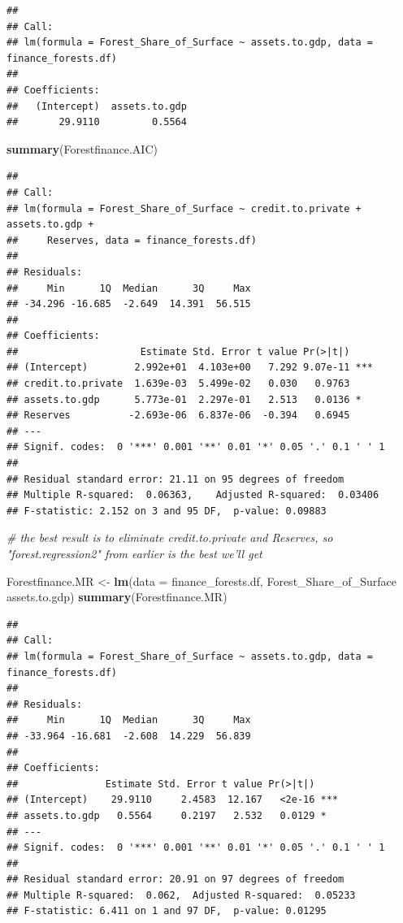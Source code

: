 \documentclass[
  12pt,
]{article}
\newenvironment{Shaded}{\begin{snugshade}}{\end{snugshade}}
\newcommand{\CommentTok}[1]{\textcolor[rgb]{0.56,0.35,0.01}{\textit{#1}}}
\newcommand{\DataTypeTok}[1]{\textcolor[rgb]{0.13,0.29,0.53}{#1}}
\newcommand{\KeywordTok}[1]{\textcolor[rgb]{0.13,0.29,0.53}{\textbf{#1}}}
\newcommand{\NormalTok}[1]{#1}
\newcommand{\OperatorTok}[1]{\textcolor[rgb]{0.81,0.36,0.00}{\textbf{#1}}}
\newcommand{\StringTok}[1]{\textcolor[rgb]{0.31,0.60,0.02}{#1}}
\begin{document}
\begin{verbatim}
## 
## Call:
## lm(formula = Forest_Share_of_Surface ~ assets.to.gdp, data = finance_forests.df)
## 
## Coefficients:
##   (Intercept)  assets.to.gdp  
##       29.9110         0.5564
\end{verbatim}

\begin{Shaded}
\begin{Highlighting}[]
 \KeywordTok{summary}\NormalTok{(Forestfinance.AIC)}
\end{Highlighting}
\end{Shaded}

\begin{verbatim}
## 
## Call:
## lm(formula = Forest_Share_of_Surface ~ credit.to.private + assets.to.gdp + 
##     Reserves, data = finance_forests.df)
## 
## Residuals:
##     Min      1Q  Median      3Q     Max 
## -34.296 -16.685  -2.649  14.391  56.515 
## 
## Coefficients:
##                     Estimate Std. Error t value Pr(>|t|)    
## (Intercept)        2.992e+01  4.103e+00   7.292 9.07e-11 ***
## credit.to.private  1.639e-03  5.499e-02   0.030   0.9763    
## assets.to.gdp      5.773e-01  2.297e-01   2.513   0.0136 *  
## Reserves          -2.693e-06  6.837e-06  -0.394   0.6945    
## ---
## Signif. codes:  0 '***' 0.001 '**' 0.01 '*' 0.05 '.' 0.1 ' ' 1
## 
## Residual standard error: 21.11 on 95 degrees of freedom
## Multiple R-squared:  0.06363,    Adjusted R-squared:  0.03406 
## F-statistic: 2.152 on 3 and 95 DF,  p-value: 0.09883
\end{verbatim}

\begin{Shaded}
\begin{Highlighting}[]
\CommentTok{# the best result is to eliminate credit.to.private and Reserves, so "forest.regression2" from earlier is the best we'll get}

\NormalTok{Forestfinance.MR <-}\StringTok{ }\KeywordTok{lm}\NormalTok{(}\DataTypeTok{data =}\NormalTok{ finance_forests.df, Forest_Share_of_Surface }\OperatorTok{~}\StringTok{ }\NormalTok{assets.to.gdp)}
\KeywordTok{summary}\NormalTok{(Forestfinance.MR)}
\end{Highlighting}
\end{Shaded}

\begin{verbatim}
## 
## Call:
## lm(formula = Forest_Share_of_Surface ~ assets.to.gdp, data = finance_forests.df)
## 
## Residuals:
##     Min      1Q  Median      3Q     Max 
## -33.964 -16.681  -2.608  14.229  56.839 
## 
## Coefficients:
##               Estimate Std. Error t value Pr(>|t|)    
## (Intercept)    29.9110     2.4583  12.167   <2e-16 ***
## assets.to.gdp   0.5564     0.2197   2.532   0.0129 *  
## ---
## Signif. codes:  0 '***' 0.001 '**' 0.01 '*' 0.05 '.' 0.1 ' ' 1
## 
## Residual standard error: 20.91 on 97 degrees of freedom
## Multiple R-squared:  0.062,  Adjusted R-squared:  0.05233 
## F-statistic: 6.411 on 1 and 97 DF,  p-value: 0.01295
\end{verbatim}
\end{document}
